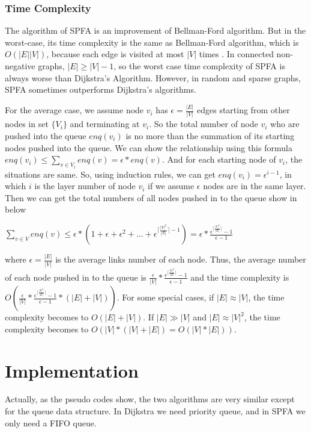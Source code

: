 \documentclass[a4paper, margin=15in]{article}
\begin{document}
\subsubsection{Time Complexity}
	The algorithm of SPFA is an improvement of Bellman-Ford algorithm. But in the worst-case, its time complexity is the same as Bellman-Ford algorithm, which is $O(|E||V|)$, because each edge is visited at most $|V|$ times \cite{cormen2009introduction}. In connected non-negative graphs, $|E|\geq|V|-1$, so the worst case time complexity of SPFA is always worse than Dijkstra's Algorithm. However, in random and sparse graphs, SPFA sometimes outperforms Dijkstra's algorithms. \cite{WikiSPFA}

	For the average case, we assume node $v_i$ has $\epsilon=\frac{|E|}{|V|}$ edges starting from other nodes in set $\{V_i\}$ and terminating at $v_i$. So the total number of node $v_i$ who are pushed into the queue $enq(v_i)$ is no more than the summation of its starting nodes pushed into the queue. We can show the relationship using this formula $enq(v_i)\leq\sum_{v \in V_i} enq(v)=\epsilon* enq(v)$. And for each starting node of $v_i$, the situations are same. So, using induction rules, we can get $enq(v_i)=\epsilon^{i-1}$, in which $i$ is the layer number of node $v_i$ if we assume $\epsilon$ nodes are in the same layer. Then we can get the total numbers of all nodes pushed in to the queue show in below

		$\sum_{v \in V} enq(v)\leq\epsilon*(1+\epsilon+\epsilon^2+...+\epsilon^{\lceil\frac{|V|^2}{|E|}\rceil-1} )=\epsilon*\frac{\epsilon^{\lceil\frac{|V|^2}{|E|}\rceil}-1}{\epsilon-1}$

where $\epsilon=\frac{|E|}{|V|}$ is the average links number of each node.
Thus, the average number of each node pushed in to the queue is $\frac{\epsilon}{|V|}*\frac{\epsilon^{\lceil\frac{|V|^2}{|E|}\rceil}-1}{\epsilon-1}$ and the time complexity is $O(\frac{\epsilon}{|V|}*\frac{\epsilon^{\lceil\frac{|V|^2}{|E|}\rceil}-1}{\epsilon-1}*(|E|+|V|))$. For some special cases, if $|E|\approx|V|$, the time complexity becomes to $O(|E|+|V|)$. If $|E|\gg|V|$ and $|E|\approx|V|^2$, the time complexity becomes to $O(|V|*(|V|+|E|)=O(|V|*|E|))$.


\section{Implementation}

Actually, as the pseudo codes show, the two algorithms are very similar except for the queue data structure.
In Dijkstra we need priority queue, and in SPFA we only need a FIFO queue.
\end{document}
